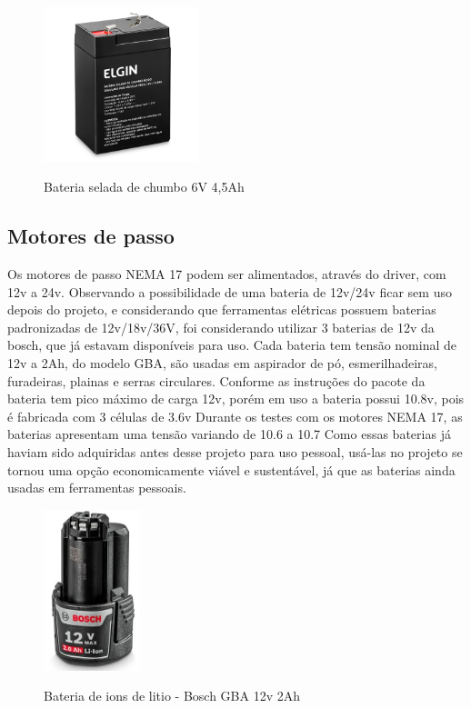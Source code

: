 \begin{figure}[ht]
	\centering
	\caption{Bateria selada de chumbo 6V 4,5Ah}
	\includegraphics[width=0.4\textwidth]{figures/bateria_6v}
	\label{bateria_6v}
\end{figure}

\subsection{Motores de passo}

Os motores de passo NEMA 17 podem ser alimentados, através do driver, com 12v a 24v.
Observando a possibilidade de uma bateria de 12v/24v ficar sem uso depois do projeto,
e considerando que ferramentas elétricas possuem baterias padronizadas de 12v/18v/36V, 
foi considerando utilizar 3 baterias de 12v da bosch, que já estavam disponíveis para uso.
Cada bateria tem tensão nominal de 12v a 2Ah, do modelo GBA, 
são usadas em aspirador de pó, esmerilhadeiras, furadeiras, plainas e serras circulares.
Conforme as instruções do pacote da bateria tem pico máximo de carga 12v, porém em uso a bateria possui 10.8v,
pois é fabricada com 3 células de 3.6v
Durante os testes com os motores NEMA 17,  as baterias apresentam uma tensão variando de 10.6 a 10.7
Como essas baterias já haviam sido adquiridas antes desse projeto para uso pessoal,
usá-las no projeto se tornou uma opção economicamente viável e sustentável,
já que as baterias ainda usadas em ferramentas pessoais.

\begin{figure}[ht]
	\centering
	\caption{Bateria de ions de litio - Bosch GBA 12v 2Ah}
	\includegraphics[width=0.25\textwidth]{figures/gba_bosch_bateria}
	\label{gba_bosch_bateria}
\end{figure}


